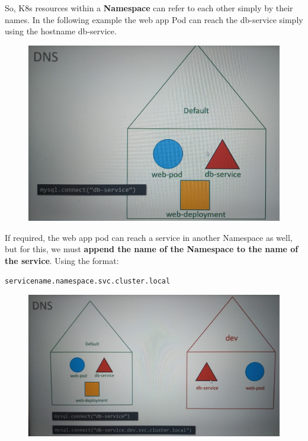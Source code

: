 \documentclass{article}
\newenvironment{codetemplate}[1][]{%
  \mybasecolorbox[#1]
  \itshape
}{%
  \endmybasecolorbox
}
\begin{document}
So, K8s resources within a \textbf{Namespace} can refer to each other simply by their names. In the following example the web app Pod can reach the db-service simply using the hostname db-service. 

\begin{figure}[H]
    \centering
    \includegraphics[scale=0.2]{pictures/namespace2.jpeg}
\end{figure}

If required, the web app pod can reach a service in another Namespace as well, but for this, we must \textbf{append the name of the Namespace to the name of the service}. Using the format:

\begin{codetemplate}{}
\begin{verbatim}
servicename.namespace.svc.cluster.local
\end{verbatim}
\end{codetemplate}

\begin{figure}[H]
    \centering
    \includegraphics[scale=0.22]{pictures/namespace3.jpeg}
\end{figure}
\end{document}
